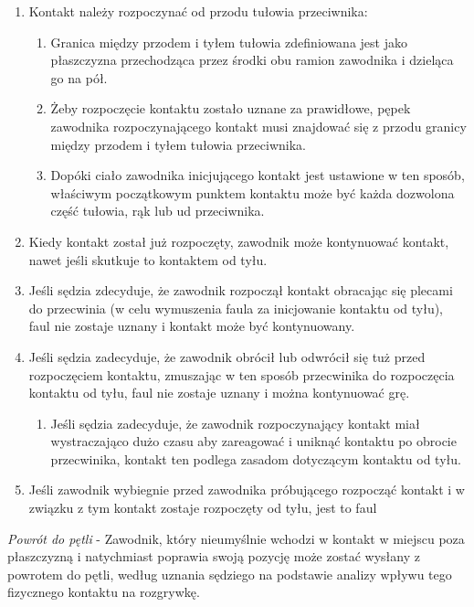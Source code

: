 \documentclass[12pt]{article}
\begin{document}
\begin{enumerate}
\item
    Kontakt należy rozpoczynać od przodu tułowia przeciwnika:
  
  \begin{enumerate}
  \item
        Granica między przodem i tyłem tułowia zdefiniowana jest jako
    płaszczyzna przechodząca przez środki obu ramion zawodnika i
    dzieląca go na pół.
      \item
        Żeby rozpoczęcie kontaktu zostało uznane za prawidłowe, pępek
    zawodnika rozpoczynającego kontakt musi znajdować się z przodu
    granicy między przodem i tyłem tułowia przeciwnika.
      \item
        Dopóki ciało zawodnika inicjującego kontakt jest ustawione w ten
    sposób, właściwym początkowym punktem kontaktu może być każda
    dozwolona część tułowia, rąk lub ud przeciwnika.
      \end{enumerate}
\item
    Kiedy kontakt został już rozpoczęty, zawodnik może kontynuować
  kontakt, nawet jeśli skutkuje to kontaktem od tyłu.
  \item
    Jeśli sędzia zdecyduje, że zawodnik rozpoczął kontakt obracając się
  plecami do przecwinia (w celu wymuszenia faula za inicjowanie kontaktu
  od tyłu), faul nie zostaje uznany i kontakt może być kontynuowany.
  \item
    Jeśli sędzia zadecyduje, że zawodnik obrócił lub odwrócił się tuż
  przed rozpoczęciem kontaktu, zmuszając w ten sposób przecwinika do
  rozpoczęcia kontaktu od tyłu, faul nie zostaje uznany i można
  kontynuować grę.
  
  \begin{enumerate}
  \item
        Jeśli sędzia zadecyduje, że zawodnik rozpoczynający kontakt miał
    wystraczająco dużo czasu aby zareagować i uniknąć kontaktu po
    obrocie przecwinika, kontakt ten podlega zasadom dotyczącym kontaktu
    od tyłu.
      \end{enumerate}
\item
    Jeśli zawodnik wybiegnie przed zawodnika próbującego rozpocząć kontakt
  i w związku z tym kontakt zostaje rozpoczęty od tyłu, jest to faul
  \end{enumerate}

\emph{Powrót do pętli} - Zawodnik, który nieumyślnie wchodzi w kontakt w
miejscu poza płaszczyzną i natychmiast poprawia swoją pozycję może
zostać wysłany z powrotem do pętli, według uznania sędziego na podstawie
analizy wpływu tego fizycznego kontaktu na rozgrywkę.
\end{document}
